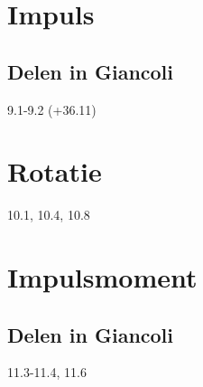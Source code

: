 \documentclass[12pt,a4paper]{article}
\begin{document}
	\section{Impuls}
	\subsection{Delen in Giancoli}
	9.1-9.2 (+36.11)
	\section{Rotatie}
	10.1, 10.4, 10.8
	\section{Impulsmoment}
	\subsection{Delen in Giancoli}
	11.3-11.4, 11.6
\end{document}
